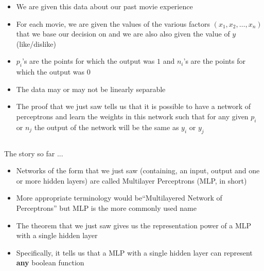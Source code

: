 \begin{frame}
\begin{columns}
\begin{overlayarea}{\textwidth}{\textheight}
			\begin{itemize}\justifying
				\item<1-> We are given this data about our past movie experience
				\item<2->For each movie, we are given the values of the various factors $(x_1, x_2,\dots, x_n)$ that we base our decision on and we are also also given the value of $y$ (like/dislike)
				\item<3-> $p_i$'s are the points for which the output was $1$ and $n_i$'s are the points for which the output was $0$
				\item<4->The data may or may not be linearly separable
				\item<5-> The proof that we just saw tells us that it is possible to have a network of perceptrons and learn the weights in this network such that for any given $p_i$ or $n_j$ the output of the network will be the same as $y_i$ or $y_j$
			\end{itemize}
		\end{overlayarea}
	\end{columns}

\end{frame}


\begin{frame}
	\begin{block}{The story so far ...}
		\begin{itemize}\justifying
			\item<1-> Networks of the form that we just saw (containing, an input, output and one or more hidden layers) are called Multilayer Perceptrons (MLP, in short)
			\item<2-> More appropriate terminology would be``Multilayered Network of Perceptrons'' but MLP is the more commonly used name
			\item<3-> The theorem that we just saw gives us the representation power of a MLP with a single hidden layer
			\item<4-> Specifically, it tells us that a MLP with a single hidden layer can represent \textbf{any} boolean function
		\end{itemize}
	\end{block}
\end{frame}

